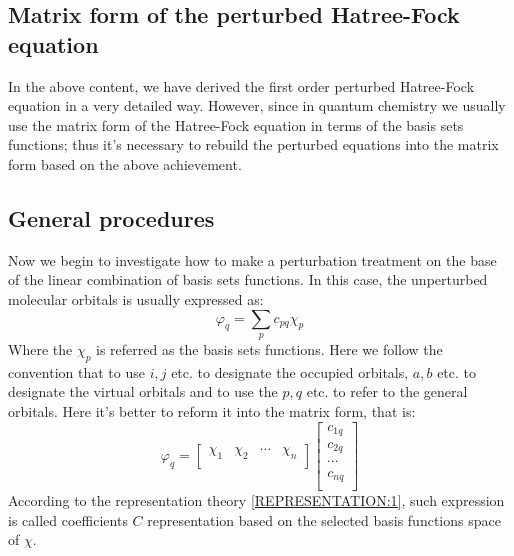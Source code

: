 \subsection{Matrix form of the perturbed Hatree-Fock equation}
%
%
%
%
In the above content, we have derived the first order perturbed
Hatree-Fock equation in a very detailed way. However, since in
quantum chemistry we usually use the matrix form of the Hatree-Fock
equation in terms of the basis sets functions; thus it's necessary
to rebuild the perturbed equations into the matrix form based on the
above achievement\cite{stevens:550}.


\subsection{General procedures}
%
%
Now we begin to investigate how to make a perturbation treatment on
the base of the linear combination of basis sets functions. In this
case, the unperturbed molecular orbitals is usually expressed as:
\begin{equation}\label{PTIMQMeq:23}
\varphi_{q} = \sum_{p}c_{pq}\chi_{p}
\end{equation}
Where the $\chi_{p}$ is referred as the basis sets functions. Here
we follow the convention that to use $i, j$ etc. to designate the
occupied orbitals, $a, b$ etc. to designate the virtual orbitals and
to use the $p, q$ etc. to refer to the general orbitals. Here it's
better to reform it into the matrix form, that is:
\begin{equation}\label{PTIMQMeq:30}
\varphi_{q} =\begin{bmatrix}
               \chi_{1} & \chi_{2} & \cdots & \chi_{n} \\
             \end{bmatrix}
             \begin{bmatrix}
               c_{1q} \\
               c_{2q} \\
               \cdots \\
               c_{nq} \\
             \end{bmatrix}
\end{equation}
According to the representation theory \ref{REPRESENTATION:1}, such
expression is called coefficients $C$ representation based on the
selected basis functions space of $\chi$.

